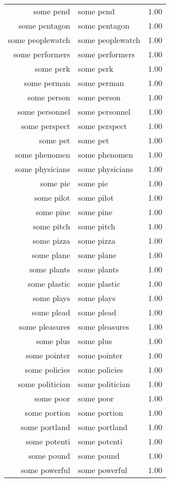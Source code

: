 \begin{table}[ht]
\begin{tabular}{rlr}
  some pend & some pend & 1.00 \\ 
  some pentagon & some pentagon & 1.00 \\ 
  some peoplewatch & some peoplewatch & 1.00 \\ 
  some performers & some performers & 1.00 \\ 
  some perk & some perk & 1.00 \\ 
  some perman & some perman & 1.00 \\ 
  some person & some person & 1.00 \\ 
  some personnel & some personnel & 1.00 \\ 
  some perspect & some perspect & 1.00 \\ 
  some pet & some pet & 1.00 \\ 
  some phenomen & some phenomen & 1.00 \\ 
  some physicians & some physicians & 1.00 \\ 
  some pie & some pie & 1.00 \\ 
  some pilot & some pilot & 1.00 \\ 
  some pine & some pine & 1.00 \\ 
  some pitch & some pitch & 1.00 \\ 
  some pizza & some pizza & 1.00 \\ 
  some plane & some plane & 1.00 \\ 
  some plants & some plants & 1.00 \\ 
  some plastic & some plastic & 1.00 \\ 
  some plays & some plays & 1.00 \\ 
  some plead & some plead & 1.00 \\ 
  some pleasures & some pleasures & 1.00 \\ 
  some plus & some plus & 1.00 \\ 
  some pointer & some pointer & 1.00 \\ 
  some policies & some policies & 1.00 \\ 
  some politician & some politician & 1.00 \\ 
  some poor & some poor & 1.00 \\ 
  some portion & some portion & 1.00 \\ 
  some portland & some portland & 1.00 \\ 
  some potenti & some potenti & 1.00 \\ 
  some pound & some pound & 1.00 \\ 
  some powerful & some powerful & 1.00 \\ 

\end{tabular}
\end{table}
